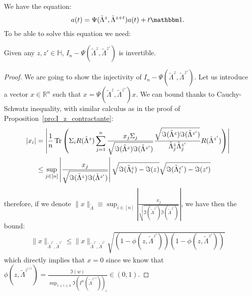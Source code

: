 \documentclass[a4papaer, titlepage]{book}
\begin{document}
  We have the equation:
  \begin{align}\label{eq:point_fixe_a}
    a(t)= \Psi(\tilde \Lambda^z, \tilde \Lambda^{z+t}) a(t) + t\un.
  \end{align}
To be able to solve this equation we need:
\begin{lemma}\label{lem:I_n_m_PsiDD_inversible}
  Given any $z,z' \in \mathbb H$, $I_n - \Psi(\tilde \Lambda^z,\tilde \Lambda^{z'})$ is invertible.
\end{lemma}

\begin{proof}
  We are going to show the injectivity of $I_n - \Psi(\tilde \Lambda^{z},\tilde \Lambda^{z'})$. Let us introduce a vector $x \in \mathbb R^n$ such that $x = \Psi(\tilde \Lambda^{z},\tilde \Lambda^{z'}) x$. We can bound thanks to Cauchy-Schwatz inequality, with similar calculus as in the proof of Proposition~\ref{pro:I_z_contractante}:
  \begin{align*}
    |x_i| 
    &=  \left\vert \frac{1}{n} \operatorname{Tr} \left(\Sigma_i R(\tilde \Lambda^{z}) \sum_{j=1}^n \frac{x_j \Sigma_j}{\sqrt{\Im(\tilde \Lambda^{z}) \Im(\tilde \Lambda^{z'}) }}\frac{\sqrt{\Im(\tilde \Lambda^{z}) \Im(\tilde \Lambda^{z'}) }}{\tilde \Lambda^{z}_j\tilde \Lambda^{z'}_j}R(\tilde \Lambda^{z'})\right)\right\vert\\
    &\leq \sup_{j\in [n]} \left\vert \frac{x_j}{\sqrt{\Im(\tilde \Lambda^{z}) \Im(\tilde \Lambda^{z'}) }}\right\vert \sqrt{ \Im(\tilde \Lambda^{z}_i) - \Im(z)} \sqrt{ \Im(\tilde \Lambda^{z'}_i) - \Im(z')}
  \end{align*}
  therefore, if we denote $\|x\|_{\tilde \Lambda} \equiv \sup_{i\in [n]} \left\vert \frac{x_j}{\sqrt{\Im(\tilde \Lambda^{z'}) \Im(\tilde \Lambda^{z'}) }}\right\vert$, we have then the bound:
  \begin{align*}
    \|x\|_{\tilde \Lambda^{z'},\tilde \Lambda^{z'}} \leq \|x\|_{\tilde \Lambda^{z'},\tilde \Lambda^{z'}} \sqrt{(1-\phi(z,\tilde \Lambda^{z'}))(1-\phi(z,\tilde \Lambda^{z'}))}
  \end{align*}
  which directly implies that $x=0$ since we know that $\phi(z,\tilde \Lambda^{z^({}'{}^)}) = \frac{\Im(w)}{\sup_{1\leq i \leq n}\Im(I^w(\tilde \Lambda^{z^({}'{}^)}))_i} \in (0,1)$.
\end{proof}
\end{document}
